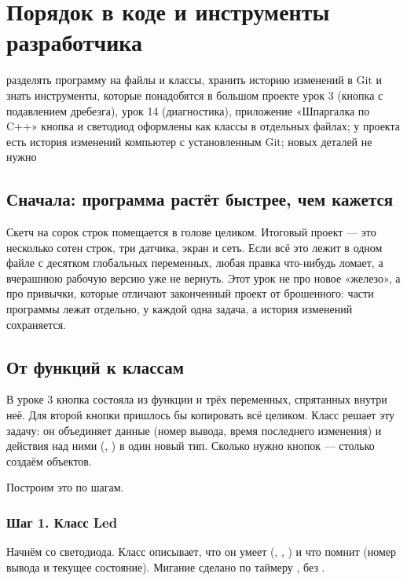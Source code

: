 \section{Порядок в коде и инструменты разработчика}
\lessonintro
  {разделять программу на файлы и классы, хранить историю изменений в Git и знать инструменты, которые понадобятся в большом проекте}
  {урок 3 (кнопка с подавлением дребезга), урок 14 (диагностика), приложение «Шпаргалка по C++»}
  {кнопка и светодиод оформлены как классы в отдельных файлах; у проекта есть история изменений}
  {компьютер с установленным Git; новых деталей не нужно}

\subsection{Сначала: программа растёт быстрее, чем кажется}

Скетч на сорок строк помещается в голове целиком. Итоговый проект --- это несколько сотен строк, три
датчика, экран и сеть. Если всё это лежит в одном файле с десятком глобальных переменных, любая правка
что-нибудь ломает, а вчерашнюю рабочую версию уже не вернуть. Этот урок не про новое «железо», а про
привычки, которые отличают законченный проект от брошенного: части программы лежат отдельно, у каждой
одна задача, а история изменений сохраняется.

\subsection{От функций к классам}

В уроке 3 кнопка состояла из функции  и трёх переменных, спрятанных внутри неё.
Для второй кнопки пришлось бы копировать всё целиком. Класс решает эту задачу: он объединяет данные
(номер вывода, время последнего изменения) и действия над ними (, )
в один новый тип. Сколько нужно кнопок --- столько создаём объектов.

Построим это по шагам.

\subsubsection{Шаг 1. Класс Led}

Начнём со светодиода. Класс описывает, что он умеет (, , ) и что
помнит (номер вывода и текущее состояние). Мигание сделано по таймеру , без .

